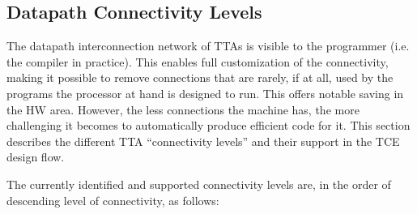 \documentclass[a4paper,twoside]{tceusermanual}
\begin{document}
\subsection{Datapath Connectivity Levels}
\label{ConnectivityLevels}
The datapath interconnection network of TTAs is visible to the
programmer (i.e. the compiler in practice).  This enables full
customization of the connectivity, making it possible to remove
connections that are rarely, if at all, used by the programs the
processor at hand is designed to run. This offers notable saving in
the HW area. However, the less connections the machine has, the more
challenging it becomes to automatically produce efficient code for
it. This section describes the different TTA ``connectivity levels''
and their support in the TCE design flow.

The currently identified and supported connectivity levels are, in the order of 
descending level of connectivity, as follows:
\end{document}
